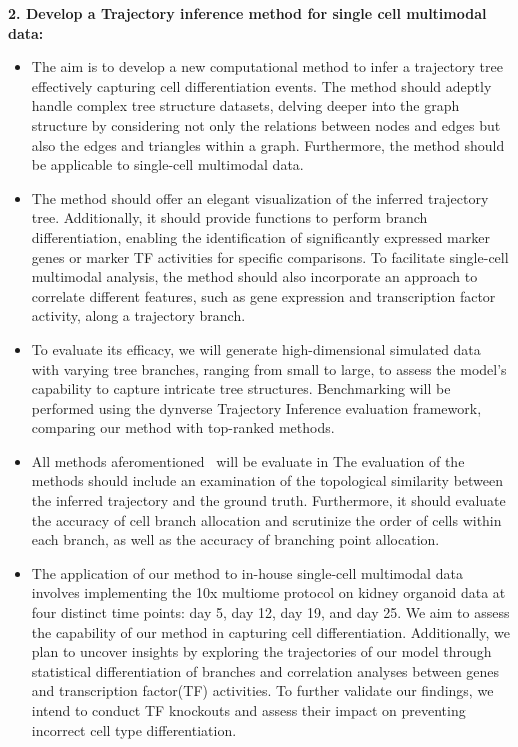 \textbf{2. Develop a Trajectory inference method for single cell multimodal data:}

\begin{itemize}
	\item 
	The aim is to develop a new computational method to infer a trajectory tree effectively capturing cell differentiation events. The method should adeptly handle complex tree structure datasets, delving deeper into the graph structure by considering not only the relations between nodes and edges but also the edges and triangles within a graph. Furthermore, the method should be applicable to single-cell multimodal data. 
	
	\item 
	The method should offer an elegant visualization of the inferred trajectory tree. Additionally, it should provide functions to perform branch differentiation, enabling the identification of significantly expressed marker genes or marker TF activities for specific comparisons. To facilitate single-cell multimodal analysis, the method should also incorporate an approach to correlate different features, such as gene expression and transcription factor activity, along a trajectory branch.
	
	\item 
	To evaluate its efficacy, we will generate high-dimensional simulated data with varying tree branches, ranging from small to large, to assess the model's capability to capture intricate tree structures. Benchmarking will be performed using the dynverse Trajectory Inference evaluation framework, comparing our method with top-ranked methods.

	\item 
	All methods aferomentioned~ will be evaluate in  The evaluation of the methods should include an examination of the topological similarity between the inferred trajectory and the ground truth. Furthermore, it should evaluate the accuracy of cell branch allocation and scrutinize the order of cells within each branch, as well as the accuracy of branching point allocation.

	\item The application of our method to in-house single-cell multimodal data involves implementing the 10x multiome protocol on kidney organoid data at four distinct time points: day 5, day 12, day 19, and day 25. We aim to assess the capability of our method in capturing cell differentiation. Additionally, we plan to uncover insights by exploring the trajectories of our model through statistical differentiation of branches and correlation analyses between genes and transcription factor(TF) activities. To further validate our findings, we intend to conduct TF knockouts and assess their impact on preventing incorrect cell type differentiation.
	
\end{itemize}


